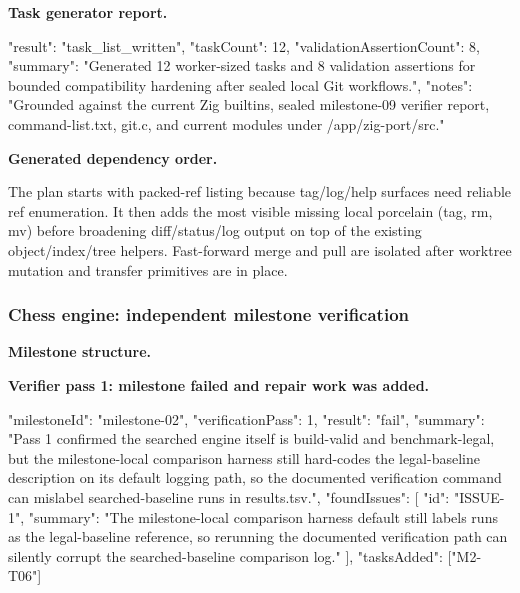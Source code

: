 \documentclass[11pt,a4paper]{article}
\begin{document}
\textbf{Task generator report.}

\begin{cbox}
{
  "result": "task_list_written",
  "taskCount": 12,
  "validationAssertionCount": 8,
  "summary": "Generated 12 worker-sized tasks and 8 validation assertions for bounded compatibility hardening after sealed local Git workflows.",
  "notes": "Grounded against the current Zig builtins, sealed milestone-09 verifier report, command-list.txt, git.c, and current modules under /app/zig-port/src."
}
\end{cbox}

\textbf{Generated dependency order.}

\begin{cbox}
The plan starts with packed-ref listing because tag/log/help surfaces need
reliable ref enumeration. It then adds the most visible missing local porcelain
(tag, rm, mv) before broadening diff/status/log output on top of the
existing object/index/tree helpers. Fast-forward merge and pull are isolated
after worktree mutation and transfer primitives are in place.
\end{cbox}

\subsubsection{Chess engine: independent milestone verification}

\textbf{Milestone structure.}

\begin{cbox}
\end{cbox}

\textbf{Verifier pass 1: milestone failed and repair work was added.}

\begin{cbox}
{
  "milestoneId": "milestone-02",
  "verificationPass": 1,
  "result": "fail",
  "summary": "Pass 1 confirmed the searched engine itself is build-valid and benchmark-legal, but the milestone-local comparison harness still hard-codes the legal-baseline description on its default logging path, so the documented verification command can mislabel searched-baseline runs in results.tsv.",
  "foundIssues": [
    { "id": "ISSUE-1",
      "summary": "The milestone-local comparison harness default still labels runs as the legal-baseline reference, so rerunning the documented verification path can silently corrupt the searched-baseline comparison log." }
  ],
  "tasksAdded": ["M2-T06"]
}
\end{cbox}
\end{document}
